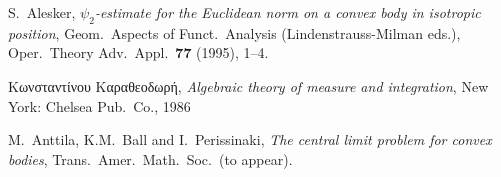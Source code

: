


\begin{thebibliography}{999}


 S.\ Alesker, \textit{$\psi_2$-estimate for the
Euclidean norm on a convex body in isotropic position}, 
Geom.\ Aspects of Funct.\ Analysis (Lindenstrauss-Milman eds.), 
Oper.\ Theory Adv.\ Appl.\ \textbf{77} (1995), 1--4.



 Κωνσταντίνου Καραθεοδωρή, 
            \textit{Algebraic theory of measure and integration}, 
            New York: Chelsea Pub.\ Co., 1986



 M.\ Anttila, K.M.\ Ball and I.\ Perissinaki,
\textit{The central limit problem for convex bodies}, 
Trans.\ Amer.\ Math.\ Soc.\ (to appear).

\end{thebibliography}

\endinput

